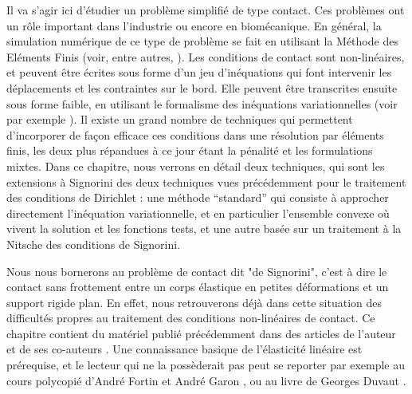 \documentclass[11pt]{book}
\begin{document}
Il va s'agir ici d'étudier un problème simplifié de type contact. Ces problèmes ont un rôle important dans l'industrie ou encore en biomécanique. En général, la simulation numérique de ce type de problème se fait en utilisant la Méthode des Eléments Finis
(voir, entre autres,
\cite{glowinski-letallec-89,han-sofonea-02,haslinger-96,kikuchi-oden-88,laursen-02,wohlmuth-11,wriggers-02}).
Les conditions de contact sont non-linéaires, et peuvent être écrites sous forme d'un jeu d'inéquations qui font intervenir les déplacements et les contraintes sur le bord. Elle peuvent être transcrites ensuite sous forme faible, en utilisant le formalisme des inéquations variationnelles
(voir par exemple \cite{fichera-63}).
Il existe un grand nombre de techniques qui permettent d'incorporer de façon efficace ces conditions dans une résolution par éléments finis, les deux plus répandues à ce jour étant la pénalité et les formulations mixtes.
Dans ce chapitre, nous verrons en détail deux techniques, qui sont les extensions à Signorini des deux techniques vues précédemment pour le traitement des conditions de Dirichlet : une méthode ``standard'' qui consiste à approcher directement l'inéquation variationnelle, et en particulier l'ensemble convexe où vivent la solution et les fonctions tests, et une autre basée sur un traitement à la Nitsche des conditions de Signorini.


Nous nous bornerons au problème de contact dit "de Signorini", c'est à dire le contact sans frottement entre un corps élastique en petites déformations et un support rigide plan. En effet, nous retrouverons déjà dans cette situation des difficultés propres au traitement des conditions non-linéaires de contact.
 Ce chapitre contient du matériel publié précédemment dans des articles de l'auteur et de ses co-auteurs %
 \cite{chouly-14,chouly-hild-12,chouly-hild-renard-13}. 
Une connaissance basique de l'élasticité linéaire est prérequise, et le lecteur qui ne la possèderait pas peut se reporter par exemple au cours polycopié d'André Fortin et André Garon \cite{fortin-2011}, ou au livre de Georges Duvaut \cite{duvaut-98}.
\end{document}
